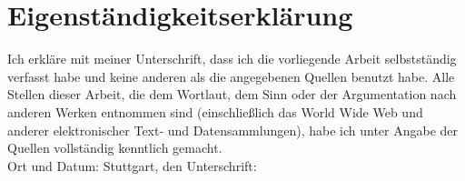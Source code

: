\chapter*{Eigenständigkeitserklärung}
Ich erkläre mit meiner Unterschrift, dass ich die vorliegende Arbeit selbstständig verfasst habe und keine anderen als die angegebenen Quellen benutzt habe. 
Alle Stellen dieser Arbeit, die dem Wortlaut, dem Sinn oder der Argumentation nach anderen Werken entnommen sind (einschließlich das World Wide Web und anderer elektronischer Text- und Datensammlungen), habe ich unter Angabe der Quellen vollständig kenntlich gemacht.
\\[2.5cm]
Ort und Datum: Stuttgart, den \hrulefill\enspace Unterschrift: \hrulefill